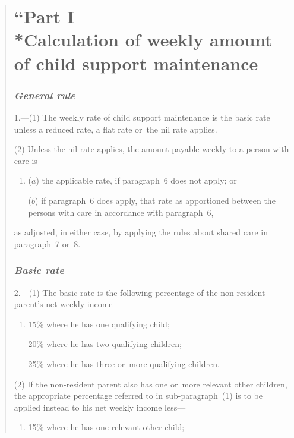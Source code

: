 \documentclass[12pt,a4paper]{article}
\begin{document}
\renewcommand\parthead{--- Schedule 1}


\begin{quotation}
\part*{\noindent “Part I\\*Calculation of weekly amount of child support maintenance}

\section*{\itshape General rule}

1.---(1) The weekly rate of child support maintenance is the basic rate unless a reduced rate, a flat rate or~the nil rate applies.

(2) Unless the nil rate applies, the amount payable weekly to a person with care is—
\begin{enumerate}\item[]
($a$) the applicable rate, if paragraph~6 does not apply; or

($b$) if paragraph~6 does apply, that rate as apportioned between the persons with care in accordance with paragraph~6,
\end{enumerate}
as adjusted, in either case, by applying the rules about shared care in paragraph~7 or~8. 

\section*{\itshape Basic rate}

2.---(1) The basic rate is the following percentage of the non-resident parent’s net weekly income—
\begin{enumerate}\item[]
    15\% where he has one qualifying child;

    20\% where he has two qualifying children;

    25\% where he has three or~more qualifying children. 
\end{enumerate}

(2) If the non-resident parent also has one or~more relevant other children, the appropriate percentage referred to in sub-paragraph~(1)  is to be applied instead to his net weekly income less—
\begin{enumerate}\item[]
    15\% where he has one relevant other child;


\end{enumerate}
\end{quotation}
\end{document}
